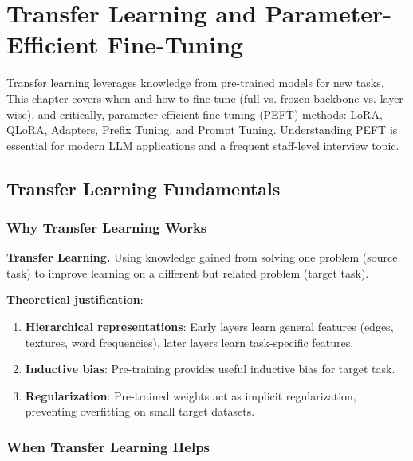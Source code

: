 \chapter{Transfer Learning and Parameter-Efficient Fine-Tuning}
\label{chap:transfer_learning}

\begin{tldr}
Transfer learning leverages knowledge from pre-trained models for new tasks. This chapter covers when and how to fine-tune (full vs. frozen backbone vs. layer-wise), and critically, parameter-efficient fine-tuning (PEFT) methods: LoRA, QLoRA, Adapters, Prefix Tuning, and Prompt Tuning. Understanding PEFT is essential for modern LLM applications and a frequent staff-level interview topic.
\end{tldr}

\section{Transfer Learning Fundamentals}
\label{sec:transfer_fundamentals}

\subsection{Why Transfer Learning Works}

\textbf{Transfer Learning.} Using knowledge gained from solving one problem (source task) to improve learning on a different but related problem (target task).

\textbf{Theoretical justification}:
\begin{enumerate}
    \item \textbf{Hierarchical representations}: Early layers learn general features (edges, textures, word frequencies), later layers learn task-specific features.
    
    \item \textbf{Inductive bias}: Pre-training provides useful inductive bias for target task.
    
    \item \textbf{Regularization}: Pre-trained weights act as implicit regularization, preventing overfitting on small target datasets.
\end{enumerate}

\subsection{When Transfer Learning Helps}

